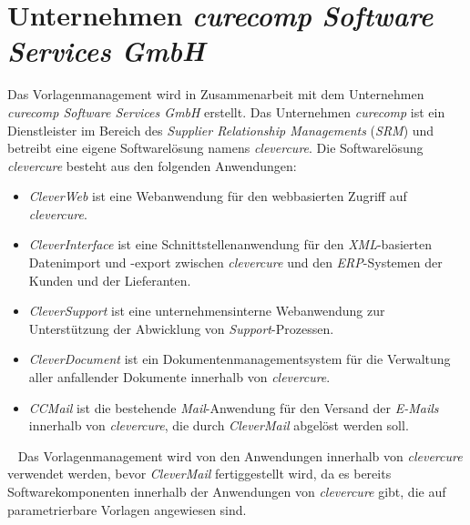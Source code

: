 \section{Unternehmen \emph{curecomp Software Services GmbH}}
Das Vorlagenmanagement wird in Zusammenarbeit mit dem Unternehmen \emph{curecomp Software Services GmbH} erstellt. Das Unternehmen \emph{curecomp} ist ein Dienstleister im Bereich des \emph{Supplier Relationship Managements} (\emph{SRM}) und betreibt eine eigene Softwarelösung namens \emph{clevercure}. Die Softwarelösung \emph{clevercure} besteht aus den folgenden Anwendungen:
\newline
\begin{itemize}
	\item\emph{CleverWeb} ist eine Webanwendung für den webbasierten Zugriff auf \emph{clevercure}.
	\item\emph{CleverInterface} ist eine Schnittstellenanwendung für den \emph{XML}-basierten Datenimport und -export zwischen \emph{clevercure} und den \emph{ERP}-Systemen der Kunden und der Lieferanten.
	\item\emph{CleverSupport} ist eine unternehmensinterne Webanwendung zur Unterstützung der Abwicklung von \emph{Support}-Prozessen.
	\item\emph{CleverDocument} ist ein Dokumentenmanagementsystem für die Verwaltung aller anfallender Dokumente innerhalb von \emph{clevercure}.
	\item\emph{CCMail} ist die bestehende \emph{Mail}-Anwendung für den Versand der \emph{E-Mails} innerhalb von \emph{clevercure}, die durch \emph{CleverMail} abgelöst werden soll.
\end{itemize}
\ \newline
Das Vorlagenmanagement wird von den Anwendungen innerhalb von \emph{clevercure} verwendet werden, bevor \emph{CleverMail} fertiggestellt wird, da es bereits Softwarekomponenten innerhalb der Anwendungen von \emph{clevercure} gibt, die auf parametrierbare Vorlagen angewiesen sind.

